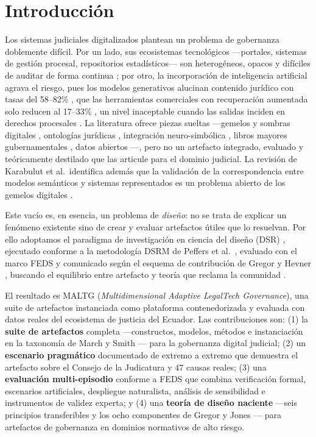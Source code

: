 \documentclass[computers,article,submit,pdftex,moreauthors]{Definitions/mdpi}
\begin{document}
\section{Introducción}
\label{sec:intro}

Los sistemas judiciales digitalizados plantean un problema de gobernanza doblemente difícil. Por un lado, sus ecosistemas tecnológicos ---portales, sistemas de gestión procesal, repositorios estadísticos--- son heterogéneos, opacos y difíciles de auditar de forma continua \cite{Rosa2013,Lupo2014}; por otro, la incorporación de inteligencia artificial agrava el riesgo, pues los modelos generativos alucinan contenido jurídico con tasas del 58--82\% \cite{Dahl2024}, que las herramientas comerciales con recuperación aumentada solo reducen al 17--33\% \cite{Magesh2025}, un nivel inaceptable cuando las salidas inciden en derechos procesales \cite{Rudin2019}. La literatura ofrece piezas sueltas ---gemelos y sombras digitales \cite{Kritzinger2018,Jones2020,Brauner2022}, ontologías jurídicas \cite{BenchCapon2012,Casanovas2016}, integración neuro-simbólica \cite{Sarker2021,Pan2024}, libros mayores gubernamentales \cite{Olnes2017}, datos abiertos \cite{Janssen2012,Attard2015}---, pero no un artefacto integrado, evaluado y teóricamente destilado que las articule para el dominio judicial. La revisión de Karabulut et al.\ identifica además que la validación de la correspondencia entre modelos semánticos y sistemas representados es un problema abierto de los gemelos digitales \cite{Karabulut2024}.

Este vacío es, en esencia, un problema de \emph{diseño}: no se trata de explicar un fenómeno existente sino de crear y evaluar artefactos útiles que lo resuelvan. Por ello adoptamos el paradigma de investigación en ciencia del diseño (DSR) \cite{Hevner2004,March1995}, ejecutado conforme a la metodología DSRM de Peffers et al.\ \cite{Peffers2007}, evaluado con el marco FEDS \cite{Venable2016} y comunicado según el esquema de contribución de Gregor y Hevner \cite{Gregor2013}, buscando el equilibrio entre artefacto y teoría que reclama la comunidad \cite{Baskerville2018,GregorJones2007}.

El resultado es MALTG (\emph{Multidimensional Adaptive LegalTech Governance}), una suite de artefactos instanciada como plataforma contenedorizada y evaluada con datos reales del ecosistema de justicia del Ecuador. Las contribuciones son: (1) la \textbf{suite de artefactos} completa ---constructos, modelos, métodos e instanciación en la taxonomía de March y Smith \cite{March1995}--- para la gobernanza digital judicial; (2) un \textbf{escenario pragmático} documentado de extremo a extremo que demuestra el artefacto sobre el Consejo de la Judicatura y 47 causas reales; (3) una \textbf{evaluación multi-episodio} conforme a FEDS que combina verificación formal, escenarios artificiales, despliegue naturalista, análisis de sensibilidad e instrumentos de validez experta; y (4) una \textbf{teoría de diseño naciente} ---seis principios transferibles y los ocho componentes de Gregor y Jones \cite{GregorJones2007}--- para artefactos de gobernanza en dominios normativos de alto riesgo.
\end{document}
